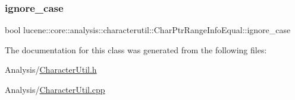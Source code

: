 \subsubsection{\texorpdfstring{ignore\+\_\+case}{ignore\_case}}
{\footnotesize\ttfamily bool lucene\+::core\+::analysis\+::characterutil\+::\+Char\+Ptr\+Range\+Info\+Equal\+::ignore\+\_\+case\hspace{0.3cm}{\ttfamily [private]}}



The documentation for this class was generated from the following files\+:\begin{DoxyCompactItemize}
\item 
Analysis/\mbox{\hyperlink{CharacterUtil_8h}{Character\+Util.\+h}}\item 
Analysis/\mbox{\hyperlink{CharacterUtil_8cpp}{Character\+Util.\+cpp}}\end{DoxyCompactItemize}
